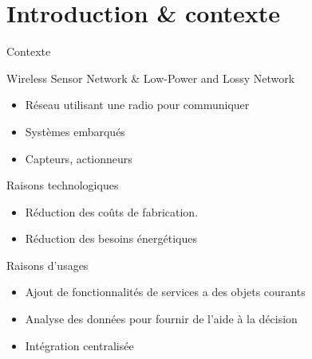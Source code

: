 \section{Introduction \& contexte}

\begin{frame}{Contexte}
  \begin{block}{Wireless Sensor Network \& Low-Power and Lossy Network}
    \begin{itemize}
      \item Réseau utilisant une radio pour communiquer
      \item Systèmes embarqués
      \item Capteurs, actionneurs
    \end{itemize}
  \end{block}

  \begin{block}{Raisons technologiques}
    \begin{itemize}
      \item Réduction des coûts de fabrication.
      \item Réduction des besoins énergétiques
    \end{itemize}
  \end{block}

  \begin{block}{Raisons d'usages}
    \begin{itemize}
      \item Ajout de fonctionnalités de services a des objets courants
      \item Analyse des données pour fournir de l'aide à la décision
      \item Intégration centralisée
    \end{itemize}
  \end{block}


\end{frame}

